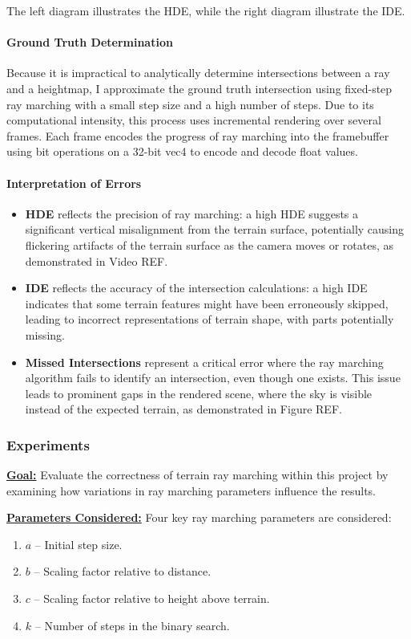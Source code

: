 {The left diagram illustrates the HDE, while the right diagram illustrate the IDE.}


\paragraph{Ground Truth Determination}
Because it is impractical to analytically determine intersections between a ray and a heightmap, I approximate the ground truth intersection using fixed-step ray marching with a small step size and a high number of steps. Due to its computational intensity, this process uses incremental rendering over several frames. Each frame encodes the progress of ray marching into the framebuffer using bit operations on a 32-bit vec4 to encode and decode float values.

\paragraph{Interpretation of Errors}
\begin{itemize}
    \item \textbf{HDE} reflects the precision of ray marching: a high HDE suggests a significant vertical misalignment from the terrain surface, potentially causing flickering artifacts of the terrain surface as the camera moves or rotates, as demonstrated in Video REF.
    \item \textbf{IDE} reflects the accuracy of the intersection calculations: a high IDE indicates that some terrain features might have been erroneously skipped, leading to incorrect representations of terrain shape, with parts potentially missing.
    \item \textbf{Missed Intersections} represent a critical error where the ray marching algorithm fails to identify an intersection, even though one exists. This issue leads to prominent gaps in the rendered scene, where the sky is visible instead of the expected terrain, as demonstrated in Figure REF.
\end{itemize}


\subsubsection{Experiments}

\textbf{\underline{Goal:}}
Evaluate the correctness of terrain ray marching within this project by examining how variations in ray marching parameters influence the results.

\textbf{\underline{Parameters Considered:}}
Four key ray marching parameters are considered:
\begin{enumerate}
    \item $a$ -- Initial step size.
    \item $b$ -- Scaling factor relative to distance.
    \item $c$ -- Scaling factor relative to height above terrain.
    \item $k$ -- Number of steps in the binary search.
\end{enumerate}

